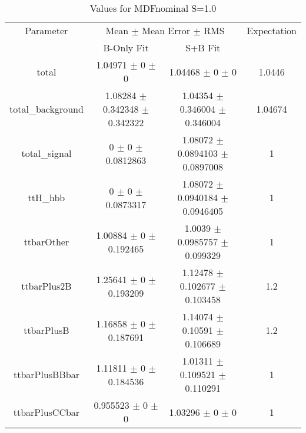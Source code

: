 \begin{table}
\centering
\caption{Values for MDFnominal S=1.0}
\begin{tabular}{cccc}
\toprule
Parameter & \multicolumn{2}{c}{Mean $\pm$ Mean Error $\pm$ RMS} & Expectation\\
 & B-Only Fit & S+B Fit & \\
\midrule
total & \num{1.04971} $\pm$ \num{0} $\pm$ \num{0} & \num{1.04468} $\pm$ \num{0} $\pm$ \num{0} & \num{1.0446}\\
total\_background & \num{1.08284} $\pm$ \num{0.342348} $\pm$ \num{0.342322} & \num{1.04354} $\pm$ \num{0.346004} $\pm$ \num{0.346004} & \num{1.04674}\\
total\_signal & \num{0} $\pm$ \num{0} $\pm$ \num{0.0812863} & \num{1.08072} $\pm$ \num{0.0894103} $\pm$ \num{0.0897008} & \num{1}\\
ttH\_hbb & \num{0} $\pm$ \num{0} $\pm$ \num{0.0873317} & \num{1.08072} $\pm$ \num{0.0940184} $\pm$ \num{0.0946405} & \num{1}\\
ttbarOther & \num{1.00884} $\pm$ \num{0} $\pm$ \num{0.192465} & \num{1.0039} $\pm$ \num{0.0985757} $\pm$ \num{0.099329} & \num{1}\\
ttbarPlus2B & \num{1.25641} $\pm$ \num{0} $\pm$ \num{0.193209} & \num{1.12478} $\pm$ \num{0.102677} $\pm$ \num{0.103458} & \num{1.2}\\
ttbarPlusB & \num{1.16858} $\pm$ \num{0} $\pm$ \num{0.187691} & \num{1.14074} $\pm$ \num{0.10591} $\pm$ \num{0.106689} & \num{1.2}\\
ttbarPlusBBbar & \num{1.11811} $\pm$ \num{0} $\pm$ \num{0.184536} & \num{1.01311} $\pm$ \num{0.109521} $\pm$ \num{0.110291} & \num{1}\\
ttbarPlusCCbar & \num{0.955523} $\pm$ \num{0} $\pm$ \num{0} & \num{1.03296} $\pm$ \num{0} $\pm$ \num{0} & \num{1}\\
\bottomrule
\end{tabular}
\end{table}